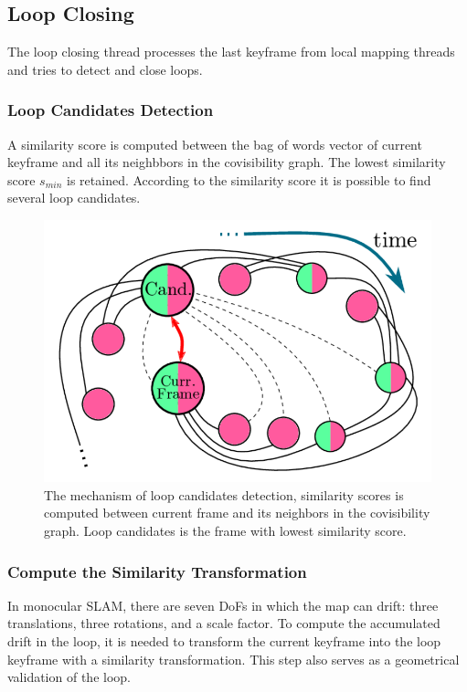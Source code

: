 \documentclass[letterpaper, 10 pt, conference]{ieeeconf}  %
\begin{document}
\subsection{Loop Closing}
The loop closing thread processes the last keyframe from local mapping threads and tries to detect and close loops.
\subsubsection{Loop Candidates Detection}
A similarity score is computed between the bag of words vector of current keyframe and all its neighbbors in the covisibility graph. The lowest similarity score $s_{min}$ is retained. According to the similarity score it is possible to find several loop candidates.
%
\begin{figure}[!htbp]%
\centering
\includegraphics[scale=0.19]{./images/loop_detection}
\caption{The mechanism of loop candidates detection, similarity scores is computed between current frame and its neighbors in the covisibility graph. Loop candidates is the frame with lowest similarity score.}
\label{loop_detection}
\end{figure}
%

\subsubsection{Compute the Similarity Transformation}
In monocular SLAM, there are seven DoFs in which the map can drift: three translations, three rotations, and a scale factor. To compute the accumulated drift in the loop, it is needed to transform the current keyframe into the loop keyframe with a similarity transformation. This step also serves as a geometrical validation of the loop.
\end{document}
